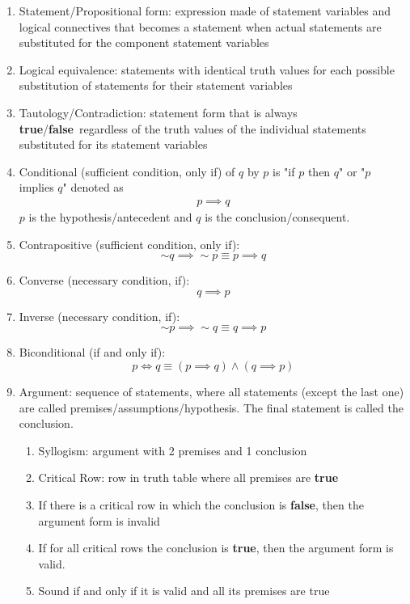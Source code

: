 \documentclass[landscape, a4paper]{article}
\newcommand{\true}{\textbf{true}}
\newcommand{\false}{\textbf{false}}
\renewcommand{\and}{\wedge}
\newenvironment{wenumerate}{\begin{enumerate}[wide, labelindent=2pt]}{\end{enumerate}}
\begin{document}
\begin{multicols*}{4}
\begin{wenumerate}
        \item Statement/Propositional form: expression made of statement variables and logical connectives that becomes a statement when actual statements are substituted for the component statement variables
        \item Logical equivalence: statements with identical truth values for each possible substitution of statements for their statement variables
        \item Tautology/Contradiction: statement form that is always \true/\false\ regardless of the truth values of the individual statements substituted for its statement variables
        \item Conditional (sufficient condition, only if) of $q$ by $p$ is "if $p$ then $q$" or "$p$ implies $q$" denoted as
        \begin{align*}
            p \implies q
        \end{align*}$p$ is the hypothesis/antecedent and $q$ is the conclusion/consequent.
        \item Contrapositive (sufficient condition, only if):
        \[{\sim} q \implies {\sim} p \equiv p \implies q\]
        \item Converse (necessary condition, if):
        \[q \implies p\]
        \item Inverse (necessary condition, if):
        \[{\sim} p \implies {\sim} q \equiv q \implies p\]
        \item Biconditional (if and only if):
        \[p \iff q\equiv (p\implies q) \and (q\implies p)\]
        \item Argument: sequence of statements, where all statements (except the last one) are called premises/assumptions/hypothesis. The final statement is called the conclusion.
        \begin{enumerate}
            \item Syllogism: argument with 2 premises and 1 conclusion
            \item Critical Row: row in truth table where all premises are \true
            \item If there is a critical row in which the conclusion is \false, then the argument form is invalid
            \item If for all critical rows the conclusion is \true, then the argument form is valid.
            \item Sound if and only if it is valid and all its premises are true
        \end{enumerate}

\end{wenumerate}
\end{multicols*}
\end{document}
